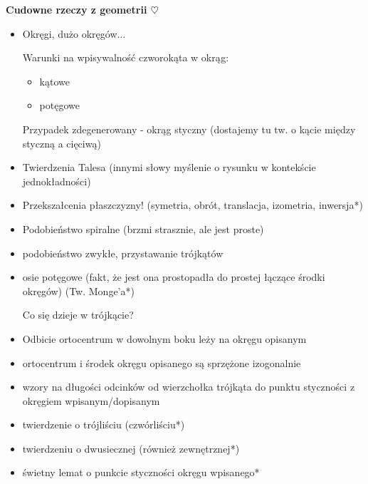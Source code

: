 \documentclass[12pt,a4paper]{article}
\begin{document}
\begin{center}
    \large{\textbf{Cudowne rzeczy z geometrii $\heartsuit$}}
\end{center}


\begin{small}
\begin{itemize}
    \item Okręgi, dużo okręgów...
    
    Warunki na wpisywalność czworokąta w okrąg:
    \begin{itemize}
        \item kątowe
        \item potęgowe
    \end{itemize}
    
    Przypadek zdegenerowany - okrąg styczny (dostajemy tu tw. o kącie między styczną a cięciwą)
    
    \item Twierdzenia Talesa (innymi słowy myślenie o rysunku w kontekście jednokładności)
    
    \item Przekszałcenia płaszczyzny! (symetria, obrót, translacja, izometria, inwersja*)
    
    \item Podobieństwo spiralne (brzmi strasznie, ale jest proste)
    
    \item podobieństwo zwykłe, przystawanie trójkątów
    
    \item osie potęgowe (fakt, że jest ona prostopadła do prostej łączące środki okręgów) (Tw. Monge'a*)
    \newline
    
    Co się dzieje w trójkącie?
    
    \item Odbicie ortocentrum w dowolnym boku leży na okręgu opisanym
    
    \item ortocentrum i środek okręgu opisanego są sprzężone izogonalnie
    
    \item wzory na długości odcinków od wierzchołka trójkąta do punktu styczności z okręgiem wpisanym/dopisanym
    
    \item twierdzenie o trójliściu (czwórliściu*)
    
    \item twierdzeniu o dwusiecznej (również zewnętrznej*)
    
    \item świetny lemat o punkcie styczności okręgu wpisanego*
    
\end{itemize}
\end{small}
\end{document}
